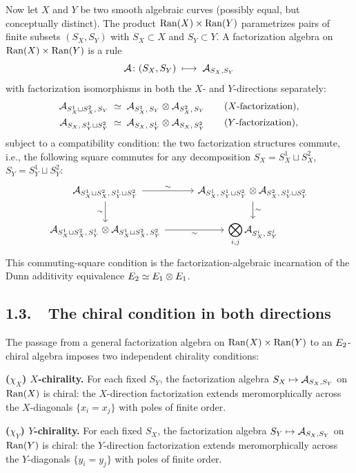 Now let $X$ and $Y$ be two smooth algebraic curves (possibly equal, but
conceptually distinct). The product $\mathrm{Ran}(X) \times \mathrm{Ran}(Y)$ parametrizes
pairs of finite subsets $(S_X, S_Y)$ with $S_X \subset X$ and
$S_Y \subset Y$. A factorization algebra on
$\mathrm{Ran}(X) \times \mathrm{Ran}(Y)$ is a rule
\[
 \mathcal{A}\colon (S_X, S_Y) \;\longmapsto\; \mathcal{A}_{S_X, S_Y}
\]
with factorization isomorphisms in both the $X$- and $Y$-directions
separately:
\begin{align}
 \label{eq:fact-X}
 \mathcal{A}_{S_X^1 \sqcup S_X^2,\, S_Y}
 &\;\simeq\;
 \mathcal{A}_{S_X^1,\, S_Y} \otimes \mathcal{A}_{S_X^2,\, S_Y}
 \qquad\text{($X$-factorization)}, \\
 \label{eq:fact-Y}
 \mathcal{A}_{S_X,\, S_Y^1 \sqcup S_Y^2}
 &\;\simeq\;
 \mathcal{A}_{S_X,\, S_Y^1} \otimes \mathcal{A}_{S_X,\, S_Y^2}
 \qquad\text{($Y$-factorization)},
\end{align}
subject to a compatibility condition: the two factorization structures
commute, i.e., the following square commutes for any decomposition
$S_X = S_X^1 \sqcup S_X^2$, $S_Y = S_Y^1 \sqcup S_Y^2$:
\[
\begin{tikzcd}[column sep=3em]
 \cA_{S_X^1 \sqcup S_X^2,\, S_Y^1 \sqcup S_Y^2}
 \ar[r, "\sim"] \ar[d, "\sim"']
 & \cA_{S_X^1,\, S_Y^1 \sqcup S_Y^2}
 \otimes \cA_{S_X^2,\, S_Y^1 \sqcup S_Y^2}
 \ar[d, "\sim"] \\
 \cA_{S_X^1 \sqcup S_X^2,\, S_Y^1}
 \otimes \cA_{S_X^1 \sqcup S_X^2,\, S_Y^2}
 \ar[r, "\sim"']
 & \displaystyle\bigotimes_{i,j} \cA_{S_X^i,\, S_Y^j}
\end{tikzcd}
\]
This commuting-square condition is the factorization-algebraic incarnation of
the Dunn additivity equivalence $E_2 \simeq E_1 \otimes E_1$.

\subsection*{1.3.\ \ The chiral condition in both directions}

The passage from a general factorization algebra on
$\mathrm{Ran}(X) \times \mathrm{Ran}(Y)$ to an $E_2$-chiral algebra imposes two
independent chirality conditions:

\medskip
\noindent\textbf{($\chi_X$) $X$-chirality.}
For each fixed $S_Y$, the factorization algebra
$S_X \mapsto \mathcal{A}_{S_X, S_Y}$ on $\mathrm{Ran}(X)$ is chiral: the $X$-direction
factorization extends meromorphically across the $X$-diagonals
$\{x_i = x_j\}$ with poles of finite order.

\medskip
\noindent\textbf{($\chi_Y$) $Y$-chirality.}
For each fixed $S_X$, the factorization algebra
$S_Y \mapsto \mathcal{A}_{S_X, S_Y}$ on $\mathrm{Ran}(Y)$ is chiral: the $Y$-direction
factorization extends meromorphically across the $Y$-diagonals
$\{y_i = y_j\}$ with poles of finite order.

